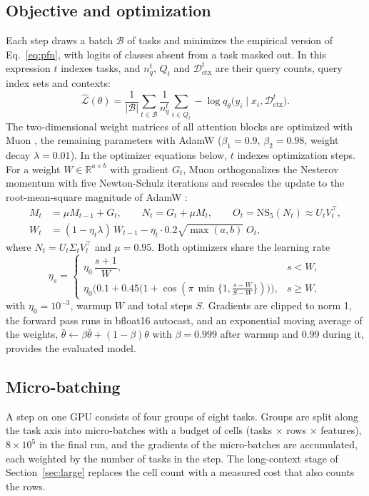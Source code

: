 \documentclass[11pt]{article}
\newcommand{\R}{\mathbb{R}}
\begin{document}
\subsection{Objective and optimization}
Each step draws a batch $\mathcal{B}$ of tasks and minimizes the empirical version of
Eq.~\eqref{eq:pfn}, with logits of classes absent from a task masked out. In this expression $t$
indexes tasks, and $n_q^t$, $Q_t$ and $\mathcal{D}^t_{\mathrm{ctx}}$ are their query counts, query
index sets and contexts:
\begin{equation}
\hat{\mathcal{L}}(\theta)=\frac{1}{|\mathcal{B}|}\sum_{t\in\mathcal{B}}\frac{1}{n_q^{t}}
\sum_{i\in Q_t}-\log q_\theta\big(y_i\mid x_i,\mathcal{D}^{t}_{\mathrm{ctx}}\big).
\end{equation}
The two-dimensional weight matrices of all attention blocks are optimized with Muon
\cite{jordan2024}, the remaining parameters with AdamW \cite{loshchilov2019}
($\beta_1=0.9$, $\beta_2=0.98$, weight decay $\lambda=0.01$). In the optimizer equations below,
$t$ indexes optimization steps. For a weight $W\in\R^{a\times b}$ with
gradient $G_t$, Muon orthogonalizes the Nesterov momentum with five Newton-Schulz iterations and
rescales the update to the root-mean-square magnitude of AdamW \cite{liu2025muon}:
\begin{align}
M_t&=\mu M_{t-1}+G_t,\qquad N_t=G_t+\mu M_t,\qquad O_t=\mathrm{NS}_5(N_t)\approx U_tV_t^{\top},\\
W_t&=(1-\eta_t\lambda)\,W_{t-1}-\eta_t\cdot 0.2\sqrt{\max(a,b)}\;O_t,
\end{align}
where $N_t=U_t\Sigma_tV_t^{\top}$ and $\mu=0.95$. Both optimizers share the learning rate
\begin{equation}
\eta_s=\begin{cases}
\eta_0\,\dfrac{s+1}{W}, & s<W,\\[8pt]
\eta_0\Big(0.1+0.45\big(1+\cos(\pi\,\min\{1,\tfrac{s-W}{S-W}\})\big)\Big), & s\ge W,
\end{cases}
\end{equation}
with $\eta_0=10^{-3}$, warmup $W$ and total steps $S$. Gradients are clipped to norm 1, the forward
pass runs in bfloat16 autocast, and an exponential moving average of the weights,
$\bar\theta\leftarrow\beta\bar\theta+(1-\beta)\theta$ with $\beta=0.999$ after warmup and 0.99
during it, provides the evaluated model.

\subsection{Micro-batching}
A step on one GPU consists of four groups of eight tasks. Groups are split along the task axis into
micro-batches with a budget of cells (tasks $\times$ rows $\times$ features), $8\times10^{5}$ in the
final run, and the
gradients of the micro-batches are accumulated, each weighted by the number of tasks in the step.
The long-context stage of Section~\ref{sec:large} replaces the cell count with a measured cost that also
counts the rows.
\end{document}
